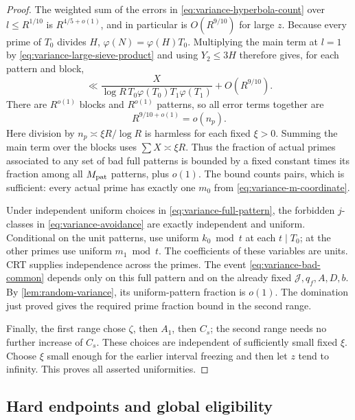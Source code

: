 \begin{proof}
The weighted sum of the errors in
\eqref{eq:variance-hyperbola-count} over \(l\le R^{1/10}\) is
\(R^{4/5+o(1)}\), and in particular is \(O(R^{9/10})\) for large \(z\).
Because every prime of \(T_0\) divides \(H\),
\(\varphi(N)=\varphi(H)T_0\). Multiplying the main term at \(l=1\) by
\eqref{eq:variance-large-sieve-product} and using \(Y_2\le3H\) therefore
gives, for each pattern and block,
\begin{equation}\label{eq:variance-pattern-primes}
 \ll \frac{X}{\log R\,T_0\varphi(T_0)T_1\varphi(T_1)}
 +O(R^{9/10}).
\end{equation}
There are \(R^{o(1)}\) blocks and \(R^{o(1)}\) patterns, so all error
terms together are
\[
 R^{9/10+o(1)}=o(n_p).
\]
Here division by \(n_p\asymp\xi R/\log R\) is harmless for each fixed
\(\xi>0\). Summing the main term over the blocks uses
\(\sum X\asymp\xi R\). Thus the fraction of actual primes associated to
any set of bad full patterns is bounded by a fixed constant times its
fraction among all \(M_{\rm pat}\) patterns, plus \(o(1)\).
The bound counts pairs, which is sufficient: every actual prime has
exactly one \(m_0\) from \eqref{eq:variance-m-coordinate}.

Under independent uniform choices in \eqref{eq:variance-full-pattern},
the forbidden \(j\)-classes in \eqref{eq:variance-avoidance} are exactly
independent and uniform. Conditional on the unit patterns, use uniform
\(k_0\bmod t\) at each \(t\mid T_0\); at the other primes use uniform
\(m_1\bmod t\). The coefficients of these variables are units.
CRT supplies independence across the primes.
The event \eqref{eq:variance-bad-common} depends only on this full
pattern and on the already fixed \(\mathcal J,q_f,A,D,b\).
By \cref{lem:random-variance}, its uniform-pattern fraction is \(o(1)\).
The domination just proved gives the required prime fraction bound in
the second range.

Finally, the first range chose \(\zeta\), then \(A_1\), then \(C_s\);
the second range needs no further increase of \(C_s\).
These choices are independent of sufficiently small fixed \(\xi\).
Choose \(\xi\) small enough for the earlier interval freezing and then
let \(z\) tend to infinity. This proves all asserted uniformities.
\end{proof}

\subsection{Hard endpoints and global eligibility}

